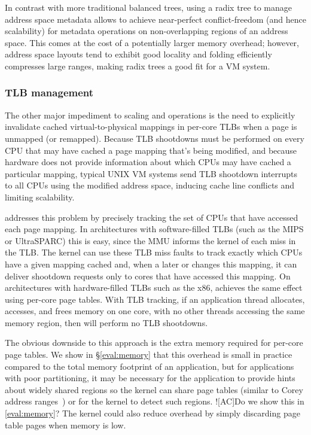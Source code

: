 In contrast with more traditional balanced trees, using a radix tree
to manage address space metadata allows \vm to achieve near-perfect
conflict-freedom (and hence scalability) for metadata operations on
non-overlapping regions of an address
space.  This comes at the cost of a potentially larger memory
overhead; however, address space layouts tend to exhibit good
locality and folding efficiently compresses large ranges, making radix
trees a good fit for a VM system.

\subsubsection{TLB management}
\label{sec:radixvm:tlb}

The other major impediment to scaling  and 
operations is the need to explicitly invalidate cached
virtual-to-physical mappings in per-core TLBs when a page is unmapped
(or remapped).
%
Because TLB shootdowns must be performed on every CPU that may have
cached a page mapping that's being modified, and because hardware does
not provide
information about which CPUs may have cached a particular mapping,
typical UNIX VM systems send TLB shootdown interrupts to all
CPUs using the modified address space, inducing cache line conflicts
and limiting scalability.

\vm addresses this problem by precisely tracking the set of CPUs that
have accessed each page mapping.
%
In architectures with software-filled TLBs (such as the MIPS or
UltraSPARC) this is easy, since the MMU informs the kernel of each
miss in the TLB.  The kernel can use these TLB miss faults to track
exactly which CPUs have a given mapping cached and, when a later
 or  changes this mapping, it can deliver
shootdown requests
only to cores that have accessed this mapping.  On architectures
with hardware-filled TLBs such as the x86, \vm achieves the
same effect using per-core page tables.
%
With TLB tracking, if an application thread
allocates, accesses, and frees memory on one core, with no other threads
accessing the same memory region, then \vm will perform no TLB shootdowns.

The obvious downside to this approach is the extra memory required for
per-core page tables.  We show in \S\ref{eval:memory} that this
overhead is small in practice compared to the total memory footprint
of an application, but for applications with poor partitioning, it may
be necessary for the application to provide hints about widely shared
regions so the kernel can share page tables (similar to Corey address
ranges~\cite{boyd-wickizer:corey}) or for the kernel to detect such
regions.
%
\XXX![AC]{Do we show this in \cref{eval:memory}?}
%
The kernel could also reduce overhead by simply discarding page table
pages when memory is low.

